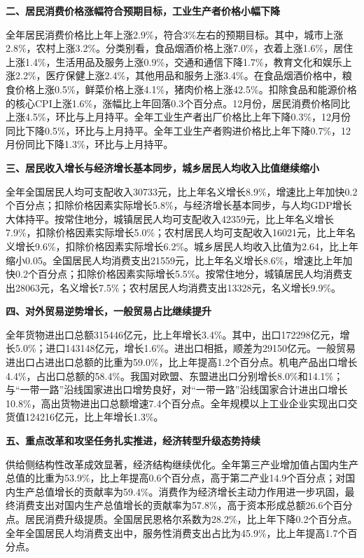 \documentclass{progbookcn}
\begin{document}
\textbf{二、居民消费价格涨幅符合预期目标，工业生产者价格小幅下降}

全年居民消费价格比上年上涨2.9\%，符合3\%左右的预期目标。其中，城市上涨2.8\%，农村上涨3.2\%。分类别看，食品烟酒价格上涨7.0\%，衣着上涨1.6\%，居住上涨1.4\%，生活用品及服务上涨0.9\%，交通和通信下降1.7\%，教育文化和娱乐上涨2.2\%，医疗保健上涨2.4\%，其他用品和服务上涨3.4\%。在食品烟酒价格中，粮食价格上涨0.5\%，鲜菜价格上涨4.1\%，猪肉价格上涨42.5\%。扣除食品和能源价格的核心CPI上涨1.6\%，涨幅比上年回落0.3个百分点。12月份，居民消费价格同比上涨4.5\%，环比与上月持平。全年工业生产者出厂价格比上年下降0.3\%，12月份同比下降0.5\%，环比与上月持平。全年工业生产者购进价格比上年下降0.7\%，12月份同比下降1.3\%，环比与上月持平。

\textbf{三、居民收入增长与经济增长基本同步，城乡居民人均收入比值继续缩小}

全年全国居民人均可支配收入30733元，比上年名义增长8.9\%，增速比上年加快0.2个百分点；扣除价格因素实际增长5.8\%，与经济增长基本同步，与人均GDP增长大体持平。按常住地分，城镇居民人均可支配收入42359元，比上年名义增长7.9\%，扣除价格因素实际增长5.0\%；农村居民人均可支配收入16021元，比上年名义增长9.6\%，扣除价格因素实际增长6.2\%。城乡居民人均收入比值为2.64，比上年缩小0.05。全国居民人均消费支出21559元，比上年名义增长8.6\%，增速比上年加快0.2个百分点；扣除价格因素实际增长5.5\%。按常住地分，城镇居民人均消费支出28063元，名义增长7.5\%；农村居民人均消费支出13328元，名义增长9.9\%。

\textbf{四、对外贸易逆势增长，一般贸易占比继续提升}

全年货物进出口总额315446亿元，比上年增长3.4\%。其中，出口172298亿元，增长5.0\%；进口143148亿元，增长1.6\%。进出口相抵，顺差为29150亿元。一般贸易进出口占进出口总额的比重为59.0\%，比上年提高1.2个百分点。机电产品出口增长4.4\%，占出口总额的58.4\%。我国对欧盟、东盟进出口分别增长8.0\%和14.1\%；与“一带一路”沿线国家进出口增势良好，对“一带一路”沿线国家合计进出口增长10.8\%，高出货物进出口总额增速7.4个百分点。全年规模以上工业企业实现出口交货值124216亿元，比上年增长1.3\%。

\textbf{五、重点改革和攻坚任务扎实推进，经济转型升级态势持续}

供给侧结构性改革成效显著，经济结构继续优化。全年第三产业增加值占国内生产总值的比重为53.9\%，比上年提高0.6个百分点，高于第二产业14.9个百分点；对国内生产总值增长的贡献率为59.4\%。消费作为经济增长主动力作用进一步巩固，最终消费支出对国内生产总值增长的贡献率为57.8\%，高于资本形成总额26.6个百分点。居民消费升级提质。全国居民恩格尔系数为28.2\%，比上年下降0.2个百分点。全年全国居民人均消费支出中，服务性消费支出占比为45.9\%，比上年提高1.7个百分点。
\end{document}

